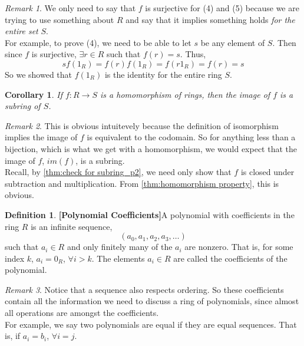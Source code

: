 \documentclass{article}
\newtheorem{corollary}{Corollary}[section]
\theoremstyle{definition}
\newtheorem{definition}{Definition}[section]
\theoremstyle{remark}
\newtheorem{remark}{Remark}[section]
\begin{document}
\begin{remark}
We only need to say that $f$ is surjective for (4) and (5) 
because we are trying to use something about $R$ and say that
it implies something holds \textit{for the entire set} $S$. \\
For example, to prove (4), we need to be able to let $s$ be any element of $S$. Then
since $f$ is surjective, $\exists r \in R$ such that $f(r) = s$.
Thus, \[
s f(1_R) = f(r) f(1_R) = f(r 1_R) = f(r) = s
\]
So we showed that $f(1_R)$ is the identity for the entire ring $S$.
\end{remark}



\begin{corollary}
If $f: R \to S$ is a homomorphism of rings, then the image of $f$ is a subring of $S$.
\end{corollary}

\begin{remark}
This is obvious intuitevely because the definition of isomorphism
implies the image of $f$ is equivalent to the codomain. So for anything less
than a bijection, which is what we get with a homomorphism, we would 
expect that the image of $f$, $im(f)$, is a subring.\\
Recall, by \ref{thm:check for subring_p2}, we need only show that $f$ 
is closed under subtraction and multiplication. From \ref{thm:homomorphism property}, this is obvious. 
\end{remark}

\begin{definition}\textbf{[Polynomial Coefficients]}\label{def:polynomial}
A polynomial with coefficients in the ring $R$ is an infinite sequence, 
\[
(a_0, a_1, a_2, a_3,  \dots )
\]
such that $a_i \in R$ and only finitely many of the $a_i$ are 
nonzero. That is, for some index $k$, $a_i = 0_R$, $\forall i > k$. The
elements $a_i \in R$ are called the coefficients of the polynomial.
\end{definition}

\begin{remark}
Notice that a sequence also respects ordering. So these coefficients contain 
all the information we need to discuss a ring of polynomials, since almost all 
operations are amongst the coefficients. \\
For example, we say two polynomials
are equal if they are equal sequences. That is, if $a_i = b_i$, $\forall i = j$.\\
\end{remark}
\end{document}

